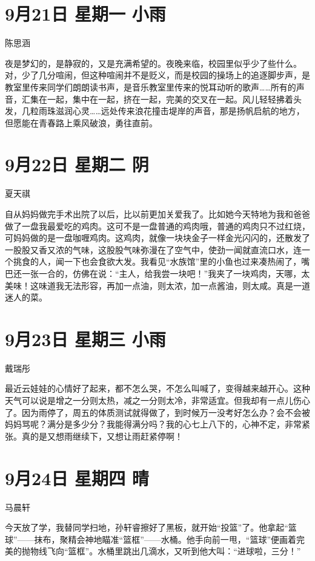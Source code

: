 \section{9月21日 星期一 小雨}

陈思涵

夜是梦幻的，是静寂的，又是充满希望的。夜晚来临，校园里似乎少了些什么。对，少了几分喧闹，但这种喧闹并不是贬义，而是校园的操场上的追逐脚步声，是教室里传来同学们朗朗读书声，是音乐教室里传来的悦耳动听的歌声\ldots\ldots 所有的声音，汇集在一起，集中在一起，挤在一起，完美的交叉在一起。风儿轻轻拂着头发，几粒雨珠滋润心灵\ldots\ldots 远处传来浪花撞击堤岸的声音，那是扬帆启航的地方，但愿能在青春路上乘风破浪，勇往直前。

\section{9月22日 星期二 阴}

夏天祺

自从妈妈做完手术出院了以后，比以前更加关爱我了。比如她今天特地为我和爸爸做了一盘我最爱吃的鸡肉。这可不是一盘普通的鸡肉哦，普通的鸡肉只不过红烧，可妈妈做的是一盘咖喱鸡肉。这鸡肉，就像一块块金子一样金光闪闪的，还散发了一股股又香又浓的气味，这股股气味弥漫在了空气中，使劲一闻就直流口水，连一个挑食的人，闻一下也会食欲大发。我看见``水族馆''里的小鱼也过来凑热闹了，嘴巴还一张一合的，仿佛在说：``主人，给我尝一块吧！''我夹了一块鸡肉，天哪，太美味！这味道我无法形容，再加一点油，则太浓，加一点酱油，则太咸。真是一道迷人的菜。

\section{9月23日 星期三 小雨}

戴瑞彤

最近云娃娃的心情好了起来，都不怎么哭，不怎么叫喊了，变得越来越开心。这种天气可以说是增之一分则太热，减之一分则太冷，非常适宜。但我却有一点儿伤心了。因为雨停了，周五的体质测试就得做了，到时候万一没考好怎么办？会不会被妈妈骂呢？满分是多少分？我能得满分吗？我的心七上八下的，心神不定，非常紧张。真的是又想雨继续下，又想让雨赶紧停啊！

\section{9月24日 星期四 晴}

马晨轩

今天放了学，我替同学扫地，孙轩睿擦好了黑板，就开始``投篮''了。他拿起``篮球''------抹布，聚精会神地瞄准``篮框''------水桶。他手向前一甩，``篮球''便画着完美的抛物线飞向``篮框''。水桶里跳出几滴水，又听到他大叫：``进球啦，三分！''

